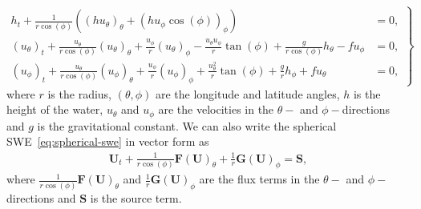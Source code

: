 \begin{equation}\label{eq:spherical-swe}
    \left.
    \begin{aligned}
        h_t + \frac{1}{r \cos (\phi)} \left( {(h u_\theta)}_{\theta} + {(h u_{\phi} \cos(\phi))}_{\phi}  \right) &= 0, \\
        {(u_{\theta})}_t  + \frac{u_\theta}{r \cos (\phi)} {(u_\theta)}_\theta + \frac{u_\phi}{r} {(u_\theta)}_{\phi}
        - \frac{u_\theta u_\phi }{r} \tan(\phi) + \frac{g}{r \cos (\phi)} h_\theta - f u_\phi &= 0, \\
        {(u_{\phi})}_t  + \frac{u_\theta}{r \cos (\phi)} {(u_\phi)}_\theta + \frac{u_\phi}{r} {(u_\phi)}_{\phi}
        + \frac{u_\theta^2}{r} \tan(\phi) + \frac{g}{r} h_\phi + f u_\theta &= 0,
    \end{aligned}
    \right\}
\end{equation}
where $r$ is the radius, $(\theta, \phi)$ are the longitude and latitude angles, $h$ is the height of the water, $u_\theta$ and $u_\phi$ are the velocities in the $\theta-$ and $\phi-$directions and $g$ is the gravitational constant.
We can also write the spherical SWE~\eqref{eq:spherical-swe} in vector form as
\begin{align}
    \mathbf{U}_t + \frac{1}{r \cos(\phi)} \mathbf{F(U)}_\theta + \frac{1}{r} \mathbf{G(U)}_\phi = \mathbf{S},
\end{align}
where $\frac{1}{r \cos(\phi)} \mathbf{F(U)}_\theta$ and $\frac{1}{r} \mathbf{G(U)}_\phi$ are the flux terms in the $\theta-$ and $\phi-$directions and $\mathbf{S}$ is the source term.




